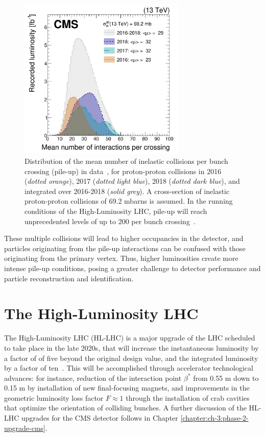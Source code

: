\begin{figure}[ht]
    \centering
    \includegraphics[width=8cm]{figures/ch-2-cern-cms/pileup-run-2-CMS-JME-18-001_Figure_001.png}
    \caption[Distribution of the mean number of inelastic collisions per bunch crossing (pile-up) in data, for proton-proton collisions in 2016-2018]{Distribution of the mean number of inelastic collisions per bunch crossing (pile-up) in data~\cite{CMS-JME-18-001}, for proton-proton collisions in 2016 (\textit{dotted orange}), 2017 (\textit{dotted light blue}), 2018 (\textit{dotted dark blue}), and integrated over 2016-2018 (\textit{solid grey}). A cross-section of inelastic proton-proton collisions of 69.2 mbarns is assumed. In the running conditions of the High-Luminosity LHC, pile-up will reach unprecedented levels of up to 200 per bunch crossing~\cite{CERN-2020-010-HL-LHC-TDR}.}
    \label{fig:pileup-run-2}
\end{figure}

These multiple collisions will lead to higher occupancies in the detector, and particles originating from the pile-up interactions can be confused with those originating from the primary vertex. Thus, higher luminosities create more intense pile-up conditions, posing a greater challenge to detector performance and particle reconstruction and identification.


\section{The High-Luminosity LHC}
\label{section:HL-LHC}
The High-Luminosity LHC (HL-LHC) is a major upgrade of the LHC scheduled to take place in the late 2020s, that will increase the instantaneous luminosity by a factor of of five beyond the original design value, and the integrated luminosity by a factor of ten~\cite{CERN-2020-010-HL-LHC-TDR}. This will be accomplished through accelerator technological advances: for instance, reduction of the interaction point $\beta^*$ from 0.55 m down to 0.15 m by installation of new final-focusing magnets, and improvements in the geometric luminosity loss factor $F \approx 1$ through the installation of crab cavities that optimize the orientation of colliding bunches. A further discussion of the HL-LHC upgrades for the CMS detector follows in Chapter \ref{chapter:ch-3:phase-2-upgrade-cms}.


